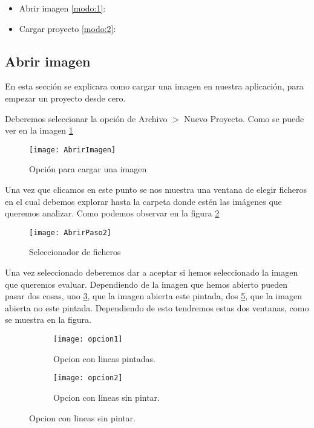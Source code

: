 \begin{itemize}
	\item Abrir imagen \ref{modo:1}:

	\item Cargar proyecto \ref{modo:2}:
	
\end{itemize}


\label{modo:1}
\subsection{Abrir imagen}
En esta sección se explicara como cargar una imagen en nuestra aplicación, para empezar un proyecto desde cero.

Deberemos seleccionar la opción de Archivo  $>$ Nuevo Proyecto. Como se puede ver en la imagen \ref{fig:abrirPro}

\begin{figure}[h]
\centering
\texttt{[image: AbrirImagen]}
\caption{Opción para cargar una imagen}
\label{fig:abrirPro}
\end{figure}

Una vez que clicamos en este punto se nos muestra una ventana de elegir ficheros en el cual debemos explorar hasta la carpeta donde estén las imágenes que queremos analizar. Como podemos observar en la figura \ref{fig:abrirPaso2}

\begin{figure}[h]
\centering
\texttt{[image: AbrirPaso2]}
\caption{Seleccionador de ficheros}
\label{fig:abrirPaso2}
\end{figure}

Una vez seleccionado deberemos dar a aceptar si hemos seleccionado la imagen que queremos evaluar.
Dependiendo de la imagen que hemos abierto pueden pasar dos cosas, uno \ref{fig:opcion1}, que la imagen abierta este pintada, dos \ref{fig:opcion2}, que la imagen abierta no este pintada. Dependiendo de esto tendremos estas dos ventanas, como se muestra en la figura.


\begin{figure}
	\begin{subfigure}[c]{.5\linewidth}
	\centering\large \texttt{[image: opcion1]}
	\caption{Opcion con lineas pintadas.}\label{fig:opcion1}
	\end{subfigure}%
	\begin{subfigure}[c]{.5\linewidth}
	\centering\large \texttt{[image: opcion2]}
	\caption{Opcion con lineas sin pintar.}\label{fig:opcion2}
	\end{subfigure}%
\end{figure}




